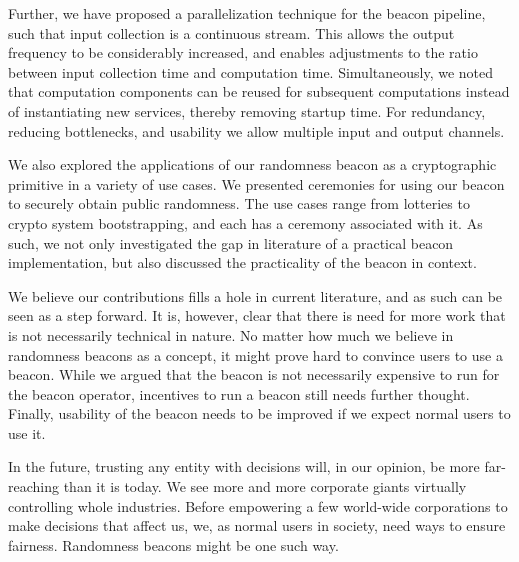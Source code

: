 Further, we have proposed a parallelization technique for the beacon pipeline, such that input collection is a continuous stream.
This allows the output frequency to be considerably increased, and enables adjustments to the ratio between input collection time and computation time.
Simultaneously, we noted that computation components can be reused for subsequent computations instead of instantiating new services, thereby removing startup time.
For redundancy, reducing bottlenecks, and usability we allow multiple input and output channels.

We also explored the applications of our randomness beacon as a cryptographic primitive in a variety of use cases.
We presented ceremonies for using our beacon to securely obtain public randomness.
The use cases range from lotteries to crypto system bootstrapping, and each has a ceremony associated with it.
As such, we not only investigated the gap in literature of a practical beacon implementation, but also discussed the practicality of the beacon in context.

We believe our contributions fills a hole in current literature, and as such can be seen as a step forward.
It is, however, clear that there is need for more work that is not necessarily technical in nature.
No matter how much we believe in randomness beacons as a concept, it might prove hard to convince users to use a beacon.
While we argued that the beacon is not necessarily expensive to run for the beacon operator, incentives to run a beacon still needs further thought.
Finally, usability of the beacon needs to be improved if we expect normal users to use it.

In the future, trusting any entity with decisions will, in our opinion, be more far-reaching than it is today.
We see more and more corporate giants virtually controlling whole industries.
Before empowering a few world-wide corporations to make decisions that affect us, we, as normal users in society, need ways to ensure fairness.
Randomness beacons might be one such way.
